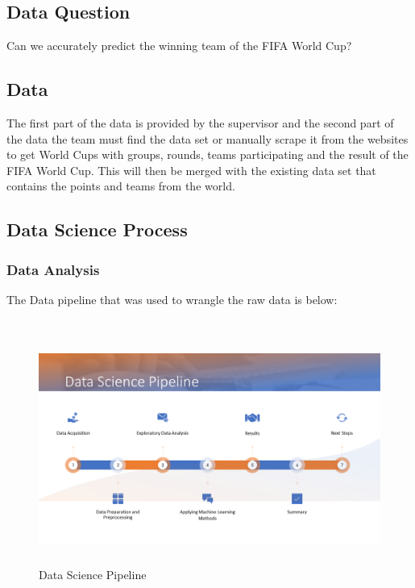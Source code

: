 \documentclass[11pt,a4paper]{article}
\begin{document}
\subsection{Data Question}

Can we accurately predict the winning team of the FIFA World Cup?

\subsection{Data}

The first part of the data is provided by the supervisor and the second part of the data the team must find the data set or manually scrape it from the websites to get World Cups with groups, rounds, teams participating and the result of the FIFA World Cup. This will then be merged with the existing data set that contains the points and teams from the world.


\newpage

\subsection{Data Science Process}

\subsubsection{Data Analysis}

The Data pipeline that was used to wrangle the raw data is below:
\\ \\
\begin{figure}[h]
	\includegraphics[height=7.5cm,width=\linewidth]{datascipipeline.PNG}
	\caption{Data Science Pipeline}
\end{figure}
\end{document}
